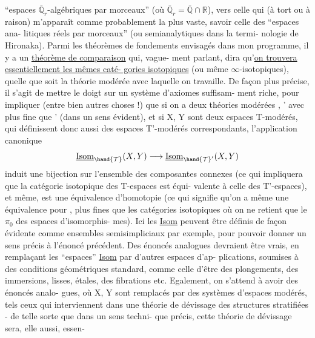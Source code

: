 
 ``espaces $\bar{\mathbb{Q}}_r$-algébriques par morceaux''
(où $\bar{\mathbb{Q}}_r = \bar{\mathbb{Q}} \cap \mathbb{R}$), vers celle qui (à tort ou à raison) m'apparaît
comme probablement la plus vaste, savoir celle des ``espaces ana-%
litiques réels par morceaux'' (ou semianalytiques dans la termi-%
nologie de Hironaka). Parmi les théorèmes de fondements envisagés
dans mon programme, il y a un \uline{théorème de comparaison} qui, vague-%
ment parlant, dira qu'\uline{on trouvera essentiellement les mêmes caté-%
gories isotopiques} (ou même $\infty$-isotopiques), quelle que soit la
théorie modérée avec laquelle on travaille. De façon plus précise,
il s'agit de mettre le doigt sur un système d'axiomes suffisam-%
ment riche, pour impliquer (entre bien autres choses !) que si on
a deux théories modérées , ' avec  plus fine que ' (dans
un sens évident), et si X, Y sont deux espaces T-modérés, qui
définissent donc aussi des espaces T'-modérés correspondants,
l'application canonique
\[ \underline{\mathrm{Isom}}_{\hand{\mathcal{T}}}(X,Y) \longrightarrow \underline{\mathrm{Isom}}_{\hand{\mathcal{T}}'}(X,Y) \]
induit une bijection sur l'ensemble des composantes connexes (ce
qui impliquera que la catégorie isotopique des T-espaces est équi-%
valente à celle des T'-espaces), et même, est une équivalence
d'homotopie (ce qui signifie qu'on a même une équivalence pour
, plus fines que les catégories
isotopiques où on ne retient que le $\pi_0$ des espaces d'isomorphis-%
mes). Ici les \uline{Isom} peuvent être définis de façon évidente comme
ensembles semisimpliciaux par exemple, pour pouvoir donner un sens
précis à l'énoncé précédent. Des énoncés analogues devraient être
vrais, en remplaçant les ``espaces'' \uline{Isom} par d'autres espaces d'ap-%
plications, soumises à des conditions géométriques standard, comme
celle d'être des plongements, des immersions, lisses, étales, des
fibrations etc. Egalement, on s'attend à avoir des énoncés analo-%
gues, où X, Y sont remplacés par des systèmes d'espaces modérés,
tels ceux qui interviennent dans une théorie de dévissage des
structures stratifiées - de telle sorte que dans un sens techni-%
que précis, cette théorie de dévissage sera, elle aussi, essen-%

